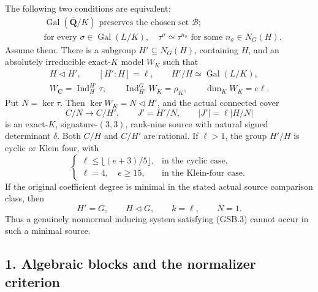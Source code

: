 \begin{theorem}
The following two conditions are equivalent:
\[
 \begin{split}
 &\operatorname{Gal}(\overline{\mathbf Q}/K)
       \text{ preserves the chosen set }\mathcal B;\\
 &\text{for every }\sigma\in\operatorname{Gal}(L/K),\quad
       \tau^\sigma\simeq\tau^{n_\sigma}
       \text{ for some }n_\sigma\in N_G(H).
 \end{split}
 \tag{GSB.3}
\]
Assume them. There is a subgroup \(H'\subseteq N_G(H)\), containing
\(H\), and an absolutely irreducible exact-\(K\) model \(W_K\)
such that
\[
 \begin{gathered}
 H\triangleleft H',\qquad [H':H]=\ell,\qquad
 H'/H\simeq\operatorname{Gal}(L/K),\\
 W_{\mathbf C}=\operatorname{Ind}_H^{H'}\tau,
 \qquad \operatorname{Ind}_{H'}^G W_K=\rho_K,
 \qquad \dim_KW_K=e\ell.
 \end{gathered}
 \tag{GSB.4}
\]
Put \(N=\ker\tau\). Then \(\ker W_K=N\triangleleft H'\), and the
actual connected cover
\[
 C/N\longrightarrow C/H',\qquad J'=H'/N,
 \qquad |J'|=\ell|H/N|
 \tag{GSB.5}
\]
is an exact-\(K\), signature-\((3,3)\), rank-nine source with natural
signed determinant \(\delta\). Both \(C/H\) and \(C/H'\) are rational.
If \(\ell>1\), the group \(H'/H\) is cyclic or Klein four, with
\[
 \begin{cases}
 \ell\le\lfloor(e+3)/5\rfloor,&\text{in the cyclic case},\\
 \ell=4,\quad e\ge15,&\text{in the Klein-four case}.
 \end{cases}
 \tag{GSB.6}
\]
If the original coefficient degree is minimal in the stated actual
source comparison class, then
\[
 H'=G,\qquad H\triangleleft G,\qquad k=\ell,
 \qquad N=1.
 \tag{GSB.7}
\]
Thus a genuinely nonnormal inducing system satisfying (GSB.3)
cannot occur in such a minimal source.
\end{theorem}

\subsection*{1. Algebraic blocks and the normalizer criterion}

